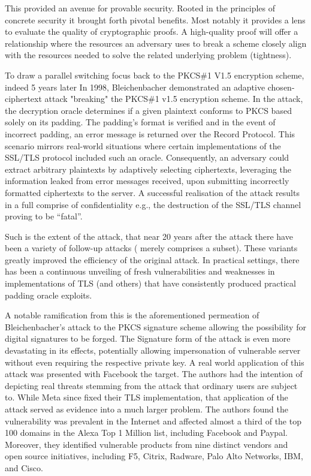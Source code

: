 \documentclass[]{final_report}
\theoremstyle{definition}
\begin{document}
This provided an avenue for provable security. Rooted in the principles of concrete security it brought forth pivotal benefits. Most notably it provides a lens to evaluate the quality of cryptographic proofs. A high-quality proof will offer a relationship where the resources an adversary uses to break a scheme closely align with the resources needed to solve the related underlying problem (tightness).

To draw a parallel switching focus back to the PKCS\#1 V1.5 encryption scheme, indeed 5 years later In 1998, Bleichenbacher demonstrated an adaptive chosen-ciphertext attack  "breaking" the PKCS\#1 v1.5 encryption scheme. In the attack, the decryption oracle determines if a given plaintext conforms to PKCS based solely on its padding. The padding’s format is verified and in the event of incorrect padding, an error message is returned over the Record Protocol. This scenario mirrors real-world situations where certain implementations of the SSL/TLS protocol included such an oracle. Consequently, an adversary could extract arbitrary plaintexts by adaptively selecting ciphertexts, leveraging the information leaked from error messages received, upon submitting incorrectly formatted ciphertexts to the server.  A successful realisation of the attack results in a full comprise of confidentiality e.g., the destruction of the SSL/TLS channel proving to be “fatal”. 

Such is the extent of the attack, that near 20 years after the attack there have been a variety of follow-up attacks   (\cite{coppersmith1996low, coron2000new, 10.1007/978-3-540-45238-6_33, degabriele2012joint, bardou2012efficient, meyer2014revisiting, zhang2014cross, jager2015security, jager2015practical, bock2018return} merely comprises a subset). These variants greatly improved the efficiency of the original attack. In practical settings, there has been a continuous unveiling of fresh vulnerabilities and weaknesses in implementations of TLS (and others) that have consistently produced practical padding oracle exploits.

A notable ramification from this is the aforementioned permeation of Bleichenbacher's attack to the PKCS signature scheme \cite{finney2006bleichenbacher, kuhn2008variants} allowing the possibility for digital signatures to be forged. The Signature form of the attack is even more devastating in its effects, potentially allowing impersonation of vulnerable server without even requiring the respective private key. A real world application of this attack was presented \cite{bock2018return} with Facebook the target. The authors had the intention of depicting real threats stemming from the attack that ordinary users are subject to. While Meta since fixed their TLS implementation, that application of the attack served as evidence into a much larger problem. The authors \cite{bock2018return} found the vulnerability was prevalent in the Internet and affected almost a third of the top 100 domains in the Alexa Top 1 Million list, including Facebook and Paypal. Moreover, they identified vulnerable products from nine distinct vendors and open source initiatives, including F5, Citrix, Radware, Palo Alto Networks, IBM, and Cisco.
\end{document}
